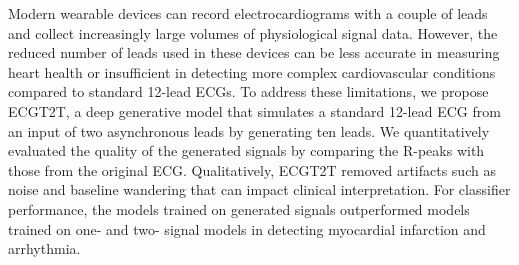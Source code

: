 Modern wearable devices can record electrocardiograms with a couple of leads and collect increasingly large volumes of physiological signal data. However, the reduced number of leads used in these devices can be less accurate in measuring heart health or insufficient in detecting more complex cardiovascular conditions compared to standard 12-lead ECGs. To address these limitations, we propose ECGT2T, a deep generative model that simulates a standard 12-lead ECG from an input of two asynchronous leads by generating ten leads. We quantitatively evaluated the quality of the generated signals by comparing the R-peaks with those from the original ECG. Qualitatively, ECGT2T removed artifacts such as noise and baseline wandering that can impact clinical interpretation. For classifier performance, the models trained on generated signals outperformed models trained on one- and two- signal models in detecting myocardial infarction and arrhythmia.



